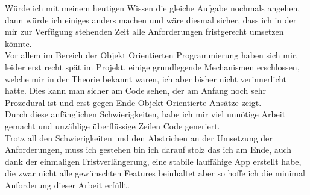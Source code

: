 Würde ich mit meinem heutigen Wissen die gleiche Aufgabe nochmals angehen, dann würde ich einiges anders machen und wäre diesmal sicher, dass ich in der mir zur Verfügung stehenden Zeit alle Anforderungen fristgerecht umsetzen könnte.\\

Vor allem im Bereich der Objekt Orientierten Programmierung haben sich mir, leider erst recht spät im Projekt, einige grundlegende Mechanismen erschlossen, welche mir in der Theorie bekannt waren, ich aber bisher nicht verinnerlicht hatte. Dies kann man sicher am Code sehen, der am Anfang noch sehr Prozedural ist und erst gegen Ende Objekt Orientierte Ansätze zeigt.\\

Durch diese anfänglichen Schwierigkeiten, habe ich mir viel unnötige Arbeit gemacht und unzählige überflüssige Zeilen Code generiert.\\

Trotz all den Schwierigkeiten und den Abstrichen an der Umsetzung der Anforderungen, muss ich gestehen bin ich darauf stolz das ich am Ende, auch dank der einmaligen Fristverlängerung, eine stabile lauffähige App erstellt habe, die zwar nicht alle gewünschten Features beinhaltet aber so hoffe ich die minimal Anforderung dieser Arbeit erfüllt.